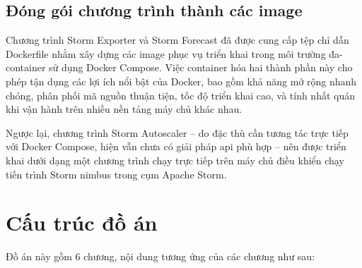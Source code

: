 \subsection{Đóng gói chương trình thành các image}

Chương trình Storm Exporter và Storm Forecast đã được cung cấp tệp chỉ dẫn Dockerfile nhằm xây dựng các image phục vụ triển khai trong môi trường đa-container sử dụng Docker Compose. Việc container hóa hai thành phần này cho phép tận dụng các lợi ích nổi bật của Docker, bao gồm khả năng mở rộng nhanh chóng, phân phối mã nguồn thuận tiện, tốc độ triển khai cao, và tính nhất quán khi vận hành trên nhiều nền tảng máy chủ khác nhau.

Ngược lại, chương trình Storm Autoscaler – do đặc thù cần tương tác trực tiếp với Docker Compose, hiện vẫn chưa có giải pháp \gls{api} phù hợp – nên được triển khai dưới dạng một chương trình chạy trực tiếp trên máy chủ điều khiển chạy tiến trình Storm nimbus trong cụm Apache Storm.

\section{Cấu trúc đồ án}

Đồ án này gồm 6 chương, nội dung tương ứng của các chương như sau:

